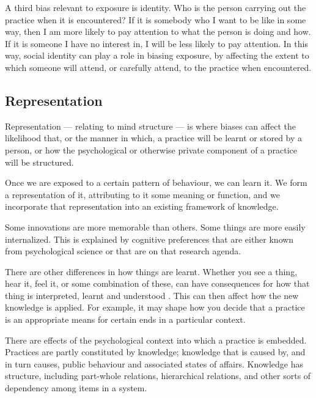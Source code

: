 A third bias relevant to exposure is identity.  Who is the person carrying out the practice when 
it is encountered? If it is somebody who I want to be like in some 
way, then I am more likely to pay attention to what the person is doing 
and how. If it is someone I have no interest in, I will be less likely to pay attention. In this way, social 
identity can play a role in biasing exposure, by affecting the extent to 
which someone will attend, or carefully attend, to the practice when 
encountered.


\subsection{Representation}
Representation --- relating to mind structure --- is where biases can 
affect the likelihood that, or the manner in which, a practice will be 
learnt or stored by a person, or how the psychological or otherwise 
private component of a practice will be structured. 



Once we are exposed to a certain pattern of behaviour, we can 
learn it. We form a representation of it, attributing to it some meaning 
or function, and we incorporate that representation into an existing framework of knowledge. 



Some innovations are more memorable than others. Some things are more easily internalized. This is explained by cognitive preferences that are either known from 
psychological science or that are on that research agenda. 



There are other differences in how things are learnt. Whether you see a thing, hear it, feel it, or some combination of these, can have 
consequences for how that thing is interpreted, learnt and understood 
\citep[Chapter 6]{enfield_anatomy_2009}. This can then affect how the new knowledge is applied. For example, it may shape how you decide that a practice 
is an appropriate means for certain ends in a particular context.



There are effects of the psychological context into which a practice is 
embedded. Practices are partly constituted by knowledge; knowledge that 
is caused by, and in turn causes, public behaviour and associated states 
of affairs. Knowledge has structure, including part-whole relations, hierarchical 
relations, and other sorts of dependency among items in a system. 



